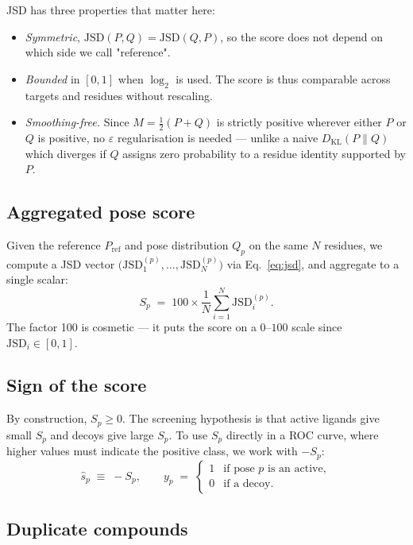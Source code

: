 \documentclass[11pt]{article}
\newcommand{\jsd}{\mathrm{JSD}}
\newcommand{\kl}{D_{\mathrm{KL}}}
\begin{document}
JSD has three properties that matter here:
\begin{itemize}[leftmargin=*]
  \item \emph{Symmetric}, $\jsd(P,Q)=\jsd(Q,P)$, so the score does not
        depend on which side we call "reference".
  \item \emph{Bounded} in $[0, 1]$ when $\log_2$ is used. The score is
        thus comparable across targets and residues without rescaling.
  \item \emph{Smoothing-free.} Since $M=\tfrac12(P+Q)$ is strictly
        positive wherever either $P$ or $Q$ is positive, no
        $\varepsilon$ regularisation is needed --- unlike a naive
        $\kl(P\|Q)$ which diverges if $Q$ assigns zero probability to a
        residue identity supported by $P$.
\end{itemize}

\subsection{Aggregated pose score}

Given the reference $P_{\mathrm{ref}}$ and pose distribution $Q_p$ on the
same $N$ residues, we compute a JSD vector
$\bigl(\jsd_1^{(p)},\dots,\jsd_N^{(p)}\bigr)$ via Eq.~\eqref{eq:jsd}, and
aggregate to a single scalar:
\begin{equation}
S_p \;=\; 100 \times \frac{1}{N} \sum_{i=1}^{N} \jsd_i^{(p)}.
\label{eq:score}
\end{equation}
The factor 100 is cosmetic --- it puts the score on a $0$--$100$ scale
since $\jsd_i \in [0,1]$.

\subsection{Sign of the score}

By construction, $S_p \ge 0$. The screening hypothesis is that active
ligands give small $S_p$ and decoys give large $S_p$. To use $S_p$
directly in a ROC curve, where higher values must indicate the positive
class, we work with $-S_p$:
\begin{equation}
\hat s_p \;\equiv\; -S_p, \qquad
y_p \;=\; \begin{cases} 1 & \text{if pose $p$ is an active}, \\ 0 & \text{if a decoy}. \end{cases}
\end{equation}

\subsection{Duplicate compounds}
\end{document}

